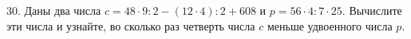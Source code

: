 30. Даны два числа $c=48\cdot9:2-(12\cdot4):2+608$ и $p=56\cdot4:7\cdot25.$ Вычислите эти числа и узнайте, во сколько раз четверть числа $c$ меньше удвоенного числа $p.$\\
